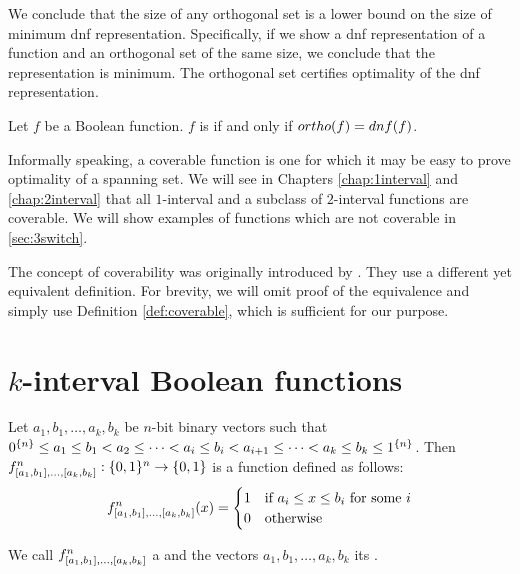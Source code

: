 We conclude that the size of any orthogonal set
is a lower bound on the size of minimum
\acrshort{dnf} representation.
Specifically,
if we show a \acrshort{dnf} representation of a function
and an orthogonal set of the same size,
we conclude that the representation is minimum.
The orthogonal set certifies
optimality of the \acrshort{dnf} representation.

\begin{definition}
\label{def:coverable}
Let $f$ be a Boolean function.
$f$ is 
if and only if
$ortho (f) = dnf (f)$.
\end{definition}

Informally speaking,
a coverable function is one for which it may be
easy to prove optimality of a spanning set.
We will see
in Chapters \ref{chap:1interval} and \ref{chap:2interval}
that all $1$-interval
and a subclass of $2$-interval functions
are coverable.
We will show examples of functions which are not coverable
in \autoref{sec:3switch}.

The concept of coverability was originally introduced by
\citet{Cepek2012}.
They use a different yet equivalent definition.
For brevity,
we will omit proof of the equivalence
and simply use Definition \ref{def:coverable},
which is sufficient for our purpose.

\section{\texorpdfstring{$k$}{k}-interval
Boolean functions}

\begin{definition}
\label{def:kibf}
Let $a_1, b_1, \ldots, a_k, b_k$ be $n$-bit binary vectors
such that $0^{\{n\}} \leq a_1 \leq b_1 < a_2
\leq \cdots < a_i \leq b_i < a_{i+1}
\leq \cdots < a_k \leq b_k \leq 1^{\{n\}}$.
Then $f^n_{[a_1, b_1], \ldots, [a_k, b_k]}: \{0, 1\}{}^n \rightarrow \{0, 1\}{}$ is a function defined as follows:
\[
f^n_{[a_1, b_1], \ldots, [a_k, b_k]} (x) =
\begin{cases}
1 & \text{if } a_i \leq x \leq b_i \text{ for some } i \\
0 & \text{otherwise}
\end{cases}
\]

We call
$f^n_{[a_1, b_1], \ldots, [a_k, b_k]}$
a 
and the vectors $a_1, b_1, \ldots, a_k, b_k$ its
.
\end{definition}

